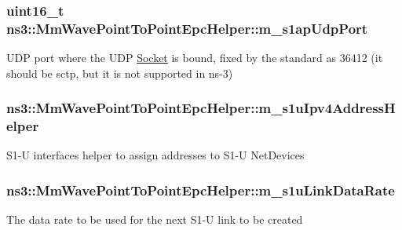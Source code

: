 \subsubsection[{\texorpdfstring{m\+\_\+s1ap\+Udp\+Port}{m_s1apUdpPort}}]{\setlength{\rightskip}{0pt plus 5cm}uint16\+\_\+t ns3\+::\+Mm\+Wave\+Point\+To\+Point\+Epc\+Helper\+::m\+\_\+s1ap\+Udp\+Port\hspace{0.3cm}{\ttfamily [private]}}\hypertarget{classns3_1_1MmWavePointToPointEpcHelper_ad1f7549ba3936b11b31d87caba866d76}{}\label{classns3_1_1MmWavePointToPointEpcHelper_ad1f7549ba3936b11b31d87caba866d76}
U\+DP port where the U\+DP \hyperlink{classns3_1_1Socket}{Socket} is bound, fixed by the standard as 36412 (it should be sctp, but it is not supported in ns-\/3) 
\subsubsection[{\texorpdfstring{m\+\_\+s1u\+Ipv4\+Address\+Helper}{m_s1uIpv4AddressHelper}}]{ ns3\+::\+Mm\+Wave\+Point\+To\+Point\+Epc\+Helper\+::m\+\_\+s1u\+Ipv4\+Address\+Helper\hspace{0.3cm}{\ttfamily [private]}}\hypertarget{classns3_1_1MmWavePointToPointEpcHelper_ac6d52e4132f31a255661f788c69be95b}{}\label{classns3_1_1MmWavePointToPointEpcHelper_ac6d52e4132f31a255661f788c69be95b}
S1-\/U interfaces helper to assign addresses to S1-\/U Net\+Devices 
\subsubsection[{\texorpdfstring{m\+\_\+s1u\+Link\+Data\+Rate}{m_s1uLinkDataRate}}]{ ns3\+::\+Mm\+Wave\+Point\+To\+Point\+Epc\+Helper\+::m\+\_\+s1u\+Link\+Data\+Rate\hspace{0.3cm}{\ttfamily [private]}}\hypertarget{classns3_1_1MmWavePointToPointEpcHelper_a6350505bc847c3c88cd0cb44de1809f7}{}\label{classns3_1_1MmWavePointToPointEpcHelper_a6350505bc847c3c88cd0cb44de1809f7}
The data rate to be used for the next S1-\/U link to be created 
